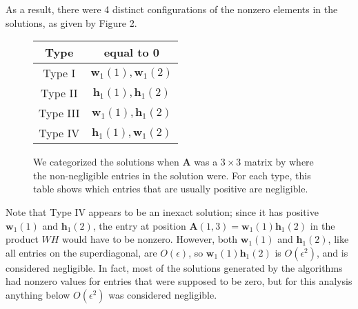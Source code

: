 \documentclass[conference]{IEEEtran}
\begin{document}
As a result, there were 4 distinct configurations of the nonzero elements in the solutions, as given by Figure 2.
\begin{figure}
\begin{center}
\begin{tabular}{|c|c|} \hline
Type & equal to 0 \\ \hline
Type I & $ \mathbf{w}_1(1), \mathbf{w}_1(2) $ \\ \hline
Type II & $ \mathbf{h}_1(1), \mathbf{h}_1(2) $ \\ \hline
Type III & $ \mathbf{w}_1(1), \mathbf{h}_1(2) $ \\ \hline
Type IV & $ \mathbf{h}_1(1), \mathbf{w}_1(2) $ \\ \hline
\end{tabular}
\caption{We categorized the solutions when $ \mathbf{A} $ was a $ 3 \times 3 $ matrix by where the non-negligible entries in the solution were.  For each type, this table shows which entries that are usually positive are negligible.}
\end{center}
\end{figure}
Note that Type IV appears to be an inexact solution; since it has positive $ \mathbf{w}_1(1) $ and $ \mathbf{h}_1(2) $, the entry at position $ \mathbf{A}(1,3) = \mathbf{w}_1(1)\mathbf{h}_1(2) $ in the product $ WH $ would have to be nonzero.  However, both $ \mathbf{w}_1(1) $ and $ \mathbf{h}_1(2) $, like all entries on the superdiagonal, are $ O(\epsilon) $, so $ \mathbf{w}_1(1) \mathbf{h}_1(2) $ is $ O(\epsilon^2) $, and is considered  negligible.  In fact, most of the solutions generated by the algorithms had nonzero values for entries that were supposed to be zero, but for this analysis anything below $ O(\epsilon^2) $ was considered negligible.
\end{document}
